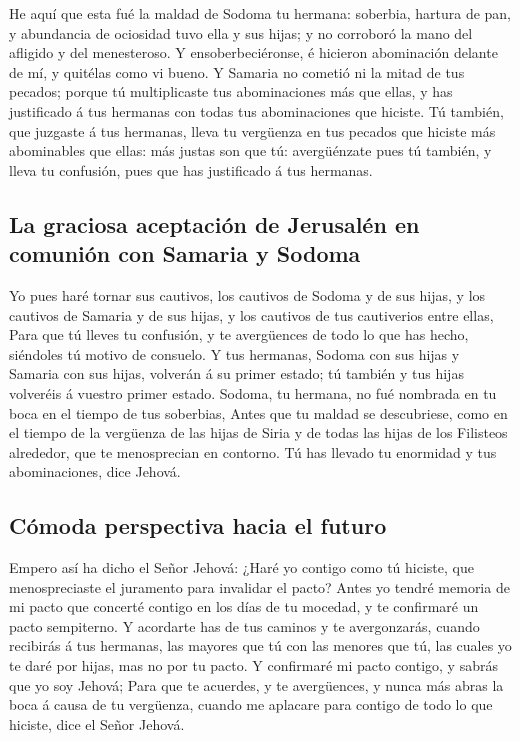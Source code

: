  He aquí que esta fué la maldad de Sodoma tu hermana:
soberbia, hartura de pan, y abundancia de ociosidad tuvo ella y sus
hijas; y no corroboró la mano del afligido y del menesteroso.
 Y ensoberbeciéronse, é hicieron abominación delante de mí,
y quitélas como vi bueno.  Y Samaria no cometió ni la mitad
de tus pecados; porque tú multiplicaste tus abominaciones más que ellas,
y has justificado á tus hermanas con todas tus abominaciones que
hiciste.  Tú también, que juzgaste á tus hermanas, lleva tu
vergüenza en tus pecados que hiciste más abominables que ellas: más
justas son que tú: avergüénzate pues tú también, y lleva tu confusión,
pues que has justificado á tus hermanas.

\hypertarget{la-graciosa-aceptaciuxf3n-de-jerusaluxe9n-en-comuniuxf3n-con-samaria-y-sodoma}{%
\subsection{La graciosa aceptación de Jerusalén en comunión con Samaria
y
Sodoma}\label{la-graciosa-aceptaciuxf3n-de-jerusaluxe9n-en-comuniuxf3n-con-samaria-y-sodoma}}

 Yo pues haré tornar sus cautivos, los cautivos de Sodoma y
de sus hijas, y los cautivos de Samaria y de sus hijas, y los cautivos
de tus cautiverios entre ellas,  Para que tú lleves tu
confusión, y te avergüences de todo lo que has hecho, siéndoles tú
motivo de consuelo.  Y tus hermanas, Sodoma con sus hijas y
Samaria con sus hijas, volverán á su primer estado; tú también y tus
hijas volveréis á vuestro primer estado.  Sodoma, tu
hermana, no fué nombrada en tu boca en el tiempo de tus soberbias,
 Antes que tu maldad se descubriese, como en el tiempo de
la vergüenza de las hijas de Siria y de todas las hijas de los Filisteos
alrededor, que te menosprecian en contorno.  Tú has llevado
tu enormidad y tus abominaciones, dice Jehová.

\hypertarget{cuxf3moda-perspectiva-hacia-el-futuro}{%
\subsection{Cómoda perspectiva hacia el
futuro}\label{cuxf3moda-perspectiva-hacia-el-futuro}}

 Empero así ha dicho el Señor Jehová: ¿Haré yo contigo como
tú hiciste, que menospreciaste el juramento para invalidar el pacto?
 Antes yo tendré memoria de mi pacto que concerté contigo
en los días de tu mocedad, y te confirmaré un pacto sempiterno.
 Y acordarte has de tus caminos y te avergonzarás, cuando
recibirás á tus hermanas, las mayores que tú con las menores que tú, las
cuales yo te daré por hijas, mas no por tu pacto.  Y
confirmaré mi pacto contigo, y sabrás que yo soy Jehová; 
Para que te acuerdes, y te avergüences, y nunca más abras la boca á
causa de tu vergüenza, cuando me aplacare para contigo de todo lo que
hiciste, dice el Señor Jehová.

